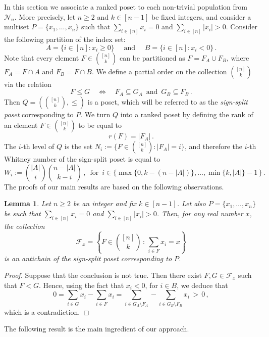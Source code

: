 \documentclass[11pt]{article}
\newtheorem{lemma}{Lemma}
\begin{document}
In this section we associate a ranked poset to each non-trivial  population  from 
$\mathcal{N}_n$. More precisely, let $n\ge 2$ and $k\in [n-1]$ be fixed integers, and consider a multiset  $P=\{x_1,\ldots,x_n\}$  such that $\sum_{i\in [n]}x_i=0$ and $\sum_{i\in [n]}|x_i| >0$. 
Consider the following partition of the index set:
\[
A = \{i\in [n] : x_i \ge 0\} \quad\text{ and }\quad B = \{i\in [n]: x_i<0\} \, .
\]
Note that every element $F\in\binom{[n]}{k}$ can be partitioned  as 
$F = F_{A} \cup F_B$, where $F_A = F\cap A$ and $F_B = F\cap B$. 
We define a partial order on the collection  $\binom{[n]}{k}$ via the relation 
\[
F\le G \quad \iff \quad F_A\subseteq G_A \,\text{ and }\, G_B\subseteq F_B \, .
\]
Then $Q=(\binom{[n]}{k}, \le)$ is a poset, which will be referred to as the \emph{sign-split  poset} corresponding to  $P$.  
We turn $Q$ into a ranked poset by defining the rank of an element $F\in \binom{[n]}{k}$ to be equal to 
\[
r(F) = |F_A| \, .
\]
The $i$-th level of $Q$ is the set $N_i:=\{F\in\binom{[n]}{k} : |F_A| = i\}$,   and therefore the   $i$-th Whitney number of the sign-split poset is equal to 
\[
W_i := \binom{|A|}{i}\binom{n-|A|}{k-i} \, , \, \text{ for } \, i\in\big\{\max\{0,k-(n-|A|)\}, \ldots, \min\{k,|A|\}-1 \,\big\}\, .
\]
The proofs of our main results are based on the following observations. 

\begin{lemma}\label{obs1}
Let $n\ge 2$ be an integer and fix $k\in [n-1]$. 
Let also $P=\{x_1,\ldots,x_n\}$ be such that  $\sum_{i\in [n]}x_i=0$ and $\sum_{i\in [n]}|x_i| >0$. 
Then, for any real number $x$, the collection  
\[
\mathcal{F}_x = \left\{F\in\binom{[n]}{k} \,:\, \sum_{i\in F} x_i = x \right\}
\]
is an antichain of the sign-split  poset corresponding to $P$. 
\end{lemma}
\begin{proof}
Suppose that the conclusion is not true. Then there exist $F,G\in\mathcal{F}_x$ such that $F<G$. 
Hence, using the fact that $x_i<0$, for $i\in B$, we deduce that 
\[
0 = \sum_{i\in G} x_i - \sum_{i\in F}x_i = \sum_{i\in G_A\setminus F_A} - \sum_{i\in G_B\setminus F_B} x_i  \,>\, 0  \, ,
\]
which is a contradiction. 
\end{proof}

The following result is the main ingredient of our approach. 
\end{document}
